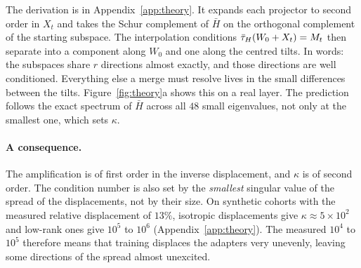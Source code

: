 The derivation is in Appendix~\ref{app:theory}. It expands each projector to
second order in $X_t$ and takes the Schur complement of $\bar H$ on the
orthogonal complement of the starting subspace. The interpolation conditions
$\bar{\tau}_H(W_0 + X_t) = M_t$ then separate into a component along $W_0$ and one
along the centred tilts. In words: the subspaces share $r$ directions almost
exactly, and those directions are well conditioned. Everything else a merge
must resolve lives in the small differences between the tilts.
Figure~\ref{fig:theory}a shows this on a real layer. The prediction follows
the exact spectrum of $\bar H$ across all $48$ small eigenvalues, not only at
the smallest one, which sets $\kappa$.

\paragraph{A consequence.} The amplification is of first order in the inverse
displacement, and $\kappa$ is of second order. The condition number is also set
by the \emph{smallest} singular value of the spread of the displacements, not by
their size. On synthetic cohorts with the measured relative
displacement of $13\%$, isotropic displacements give
$\kappa \approx 5\times10^{2}$ and low-rank ones give $10^{5}$ to $10^{6}$
(Appendix~\ref{app:theory}). The measured $10^{4}$ to $10^{5}$ therefore means
that training displaces the adapters very unevenly, leaving some directions of
the spread almost unexcited.

